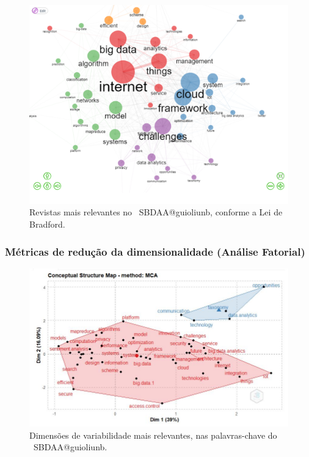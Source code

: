 \begin{figure}
    \centering
    \includegraphics[width=1\textwidth]{experiments/guioliunb/AnaliseBibliometrica/SocialBigDataAnalysis/CO OCCURRRENCE NETWORK.png}
    \caption{Revistas mais relevantes no  \dataset\ SBDAA@guioliunb, conforme a Lei de Bradford.}
    \label{fig:MASSA2-Bradfords-Law.png}
\end{figure}



\subsubsection{Métricas de redução da dimensionalidade (Análise Fatorial)}

\begin{figure}
    \centering
    \includegraphics[width=1\textwidth]{experiments/guioliunb/AnaliseBibliometrica/SocialBigDataAnalysis/conceptual factorial.JPG}
    \caption{Dimensões de variabilidade mais relevantes, nas palavras-chave do  \dataset\ SBDAA@guioliunb.}
    \label{fig:MASSA2-FactorialAnalysis-MCA-FactorialMap}
\end{figure}


